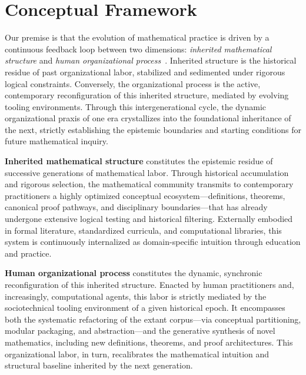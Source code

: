 \section{Conceptual Framework}

Our premise is that the evolution of mathematical practice is driven by a continuous feedback loop between two dimensions: \emph{inherited mathematical structure} and \emph{human organizational process}~\cite{avigad2024,commelin2023}. Inherited structure is the historical residue of past organizational labor, stabilized and sedimented under rigorous logical constraints. Conversely, the organizational process is the active, contemporary reconfiguration of this inherited structure, mediated by evolving tooling environments. Through this intergenerational cycle, the dynamic organizational praxis of one era crystallizes into the foundational inheritance of the next, strictly establishing the epistemic boundaries and starting conditions for future mathematical inquiry.

    \textbf{Inherited mathematical structure} constitutes the epistemic residue of successive generations of mathematical labor. Through historical accumulation and rigorous selection, the mathematical community transmits to contemporary practitioners a highly optimized conceptual ecosystem---definitions, theorems, canonical proof pathways, and disciplinary boundaries---that has already undergone extensive logical testing and historical filtering. Externally embodied in formal literature, standardized curricula, and computational libraries, this system is continuously internalized as domain-specific intuition through education and practice.

    \textbf{Human organizational process} constitutes the dynamic, synchronic reconfiguration of this inherited structure. Enacted by human practitioners and, increasingly, computational agents, this labor is strictly mediated by the sociotechnical tooling environment of a given historical epoch. It encompasses both the systematic refactoring of the extant corpus---via conceptual partitioning, modular packaging, and abstraction---and the generative synthesis of novel mathematics, including new definitions, theorems, and proof architectures. This organizational labor, in turn, recalibrates the mathematical intuition and structural baseline inherited by the next generation.

